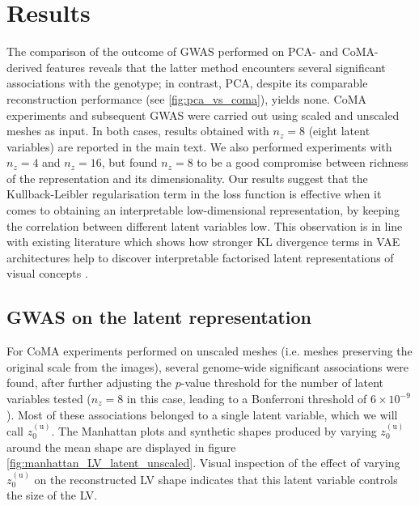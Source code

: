 \section*{Results}

The comparison of the outcome of GWAS performed on PCA- and CoMA-derived features reveals that the latter method encounters several significant associations with the genotype; in contrast, PCA, despite its comparable reconstruction performance (see \ref{fig:pca_vs_coma}), yields none. %
CoMA experiments and subsequent GWAS were carried out using scaled and unscaled meshes as input. In both cases, results obtained with $n_z=8$ (eight latent variables) are reported in the main text. We also performed experiments with $n_z=4$ and $n_z=16$, but found $n_z=8$ to be a good compromise between richness of the representation and its dimensionality. Our results suggest that the Kullback-Leibler regularisation term in the loss function is effective when it comes to obtaining an interpretable low-dimensional representation, by keeping the correlation between different latent variables low. This observation is in line with existing literature which shows how stronger KL divergence terms in VAE architectures help to discover interpretable factorised latent representations of visual concepts \cite{ref_betavae}.


\subsection*{GWAS on the latent representation}
\label{subsec_GWAS}

For CoMA experiments performed on unscaled meshes (i.e. meshes preserving the original scale from the images), several genome-wide significant associations were found, after further adjusting the $p$-value threshold for the number of latent variables tested ($n_z=8$ in this case, leading to a Bonferroni threshold of $6\times 10^{-9}$). Most of these associations belonged to a single latent variable, which we will call $z_0^{(\text{u})}$. The Manhattan plots and synthetic shapes produced by varying $z_0^{(\text{u})}$ around the mean shape are displayed in figure \ref{fig:manhattan_LV_latent_unscaled}. Visual inspection of the effect of varying $z_0^{(\text{u})}$ on the reconstructed LV shape indicates that this latent variable controls the size of the LV. 

